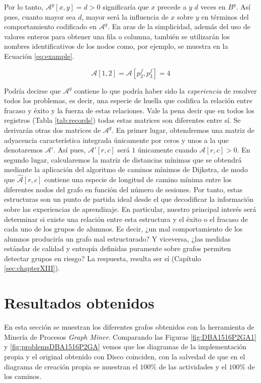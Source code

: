 Por lo tanto, $\mathcal{A}^g[x,y] = d > 0$ significaría que $x$ precede a $y$ $d$ veces en $B^g$. Así pues, cuanto mayor sea $d$, mayor será la influencia de $x$ sobre $y$ en términos del comportamiento codificado en $\mathcal{A}^g$. En aras de la simplicidad, además del uso de valores enteros para obtener una fila o columna, también se utilizarán los nombres identificativos de los nodos como, por ejemplo, se muestra en la Ecuación \ref{eq:example}.

\begin{equation}\label{eq:example}
\mathcal{A}[1,2] = \mathcal{A}[p_2^f,p_3^f] = 4
\end{equation}

Podría decirse que $\mathcal{A}^g$ contiene lo que podría haber sido la \emph{experiencia} de resolver todos los problemas, es decir, una especie de huella que codifica la relación entre fracaso y éxito y la fuerza de estas relaciones. Vale la pena decir que en todos los registros (Tabla \ref{tab:records}) todas estas matrices son diferentes entre sí. Se derivarán otras dos matrices de $\mathcal{A}^g$. En primer lugar, obtendremos una matriz de adyacencia característica integrada únicamente por ceros y unos a la que denotaremos $\mathcal{A}'$. Así pues, $\mathcal{A}'[r, c]$ será $1$ únicamente cuando $\mathcal{A}[r, c] > 0$. En segundo lugar, calcularemos la matriz de distancias mínimas que se obtendrá mediante la aplicación del algoritmo de caminos mínimos de Dijkstra, de modo que $\hat{\mathcal{A}}[r, c]$ contiene una especie de longitud de camino mínima entre los diferentes nodos del grafo en función del número de sesiones. Por tanto, estas estructuras son un punto de partida ideal desde el que decodificar la información sobre las experiencias de aprendizaje. En particular, nuestro principal interés será determinar si existe una relación entre esta estructura y el éxito o el fracaso de cada uno de los grupos de alumnos. Es decir, ¿un mal comportamiento de los alumnos produciría un grafo mal estructurado? Y viceversa, ¿las medidas estándar de calidad y entropía definidas puramente sobre grafos permiten detectar grupos en riesgo? La respuesta, resulta ser sí (Capítulo \ref{sec:chapterXIII}).

\section{Resultados obtenidos}

En esta sección se muestran los diferentes grafos obtenidos con la herramienta de Minería de Procesos \emph{Graph Miner}. Comparando las Figuras \ref{fig:DBA1516P2GA1} y \ref{fig:problemsDBA1516P2GA} vemos que los diagramas de la implementación propia y el original obtenido con Disco coinciden, con la salvedad de que en el diagrama de creación propia se muestran el $100\%$ de las actividades y el $100\%$ de los caminos.

